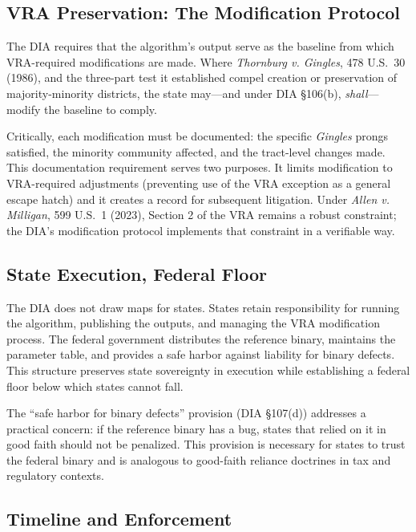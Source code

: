 \subsection{VRA Preservation: The Modification Protocol}

The DIA requires that the algorithm's output serve as the baseline from which VRA-required modifications are made. Where \textit{Thornburg v. Gingles}, 478 U.S.\ 30 (1986), and the three-part test it established compel creation or preservation of majority-minority districts, the state may---and under DIA \S106(b), \emph{shall}---modify the baseline to comply.

Critically, each modification must be documented: the specific \textit{Gingles} prongs satisfied, the minority community affected, and the tract-level changes made. This documentation requirement serves two purposes. It limits modification to VRA-required adjustments (preventing use of the VRA exception as a general escape hatch) and it creates a record for subsequent litigation. Under \textit{Allen v. Milligan}, 599 U.S.\ 1 (2023), Section 2 of the VRA remains a robust constraint; the DIA's modification protocol implements that constraint in a verifiable way.

\subsection{State Execution, Federal Floor}

The DIA does not draw maps for states. States retain responsibility for running the algorithm, publishing the outputs, and managing the VRA modification process. The federal government distributes the reference binary, maintains the parameter table, and provides a safe harbor against liability for binary defects. This structure preserves state sovereignty in execution while establishing a federal floor below which states cannot fall.

The ``safe harbor for binary defects'' provision (DIA \S107(d)) addresses a practical concern: if the reference binary has a bug, states that relied on it in good faith should not be penalized. This provision is necessary for states to trust the federal binary and is analogous to good-faith reliance doctrines in tax and regulatory contexts.

\subsection{Timeline and Enforcement}

